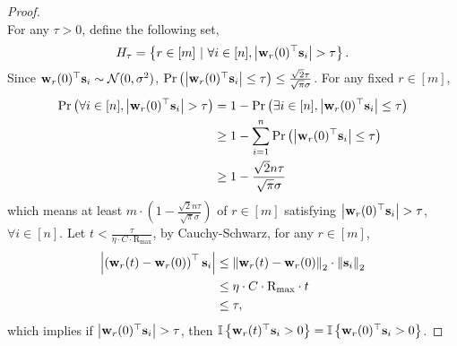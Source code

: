 \documentclass[10pt]{article}
\begin{document}
\begin{proof}
\begin{equation*}
\end{equation*}
For any $\tau > 0$, define the following set,
\begin{equation*}
	H_\tau = \left\{ r \in [m] \ | \ \forall i \in [n], \left| {\mathbf{w}}_r(0)^\top {\mathbf{s}}_i \right| > \tau \right\}.
\end{equation*}
Since ${\mathbf{w}}_r(0)^\top {\mathbf{s}}_i \sim {\mathcal{N}}(0, \sigma^2)$, ${\text{Pr}}\left(\left| {\mathbf{w}}_r(0)^\top {\mathbf{s}}_i \right| \le \tau\right) \le \frac{\sqrt{2}\tau}{\sqrt{\pi}\sigma}$. For any fixed $r \in [m]$,
\begin{equation*}
\begin{split}
	{\text{Pr}}\left(\forall i \in [n], \left| {\mathbf{w}}_r(0)^\top {\mathbf{s}}_i \right| > \tau\right) &= 1 - {\text{Pr}}\left(\exists i \in [n], \left| {\mathbf{w}}_r(0)^\top {\mathbf{s}}_i \right| \le \tau\right) \\
	&\ge 1 - \sum\limits_{i=1}^{n}{ {\text{Pr}}\left(\left| {\mathbf{w}}_r(0)^\top {\mathbf{s}}_i \right| \le \tau\right) } \\
	&\ge 1 - \frac{\sqrt{2} n\tau}{\sqrt{\pi}\sigma}
\end{split}
\end{equation*}
which means at least $m \cdot \left( 1 - \frac{\sqrt{2}n\tau}{\sqrt{\pi}\sigma} \right)$   of $r \in [m]$ satisfying $\left| {\mathbf{w}}_r(0)^\top {\mathbf{s}}_i \right| > \tau$, $\forall i \in [n]$. Let $t < \frac{\tau}{ \eta \cdot C \cdot \text{R}_{\max} }$, by Cauchy-Schwarz, for any $r \in [m]$,
\begin{equation*}
\begin{split}
	\left| \left( {\mathbf{w}}_r(t) - {\mathbf{w}}_r(0) \right)^\top {\mathbf{s}}_i \right| &\le \left\| {\mathbf{w}}_r(t) - {\mathbf{w}}_r(0) \right\|_2 \cdot \left\| {\mathbf{s}}_i \right\|_2 \\
	&\le \eta \cdot C \cdot \text{R}_{\max} \cdot t \\
	&\le \tau,
\end{split}
\end{equation*}
which implies if $\left| {\mathbf{w}}_r(0)^\top {\mathbf{s}}_i \right| > \tau$, then ${\mathbb{I}}\left\{ {\mathbf{w}}_r(t)^\top {\mathbf{s}}_i > 0 \right\} = {\mathbb{I}}\left\{ {\mathbf{w}}_r(0)^\top {\mathbf{s}}_i > 0 \right\}$.
\end{proof}
\end{document}
